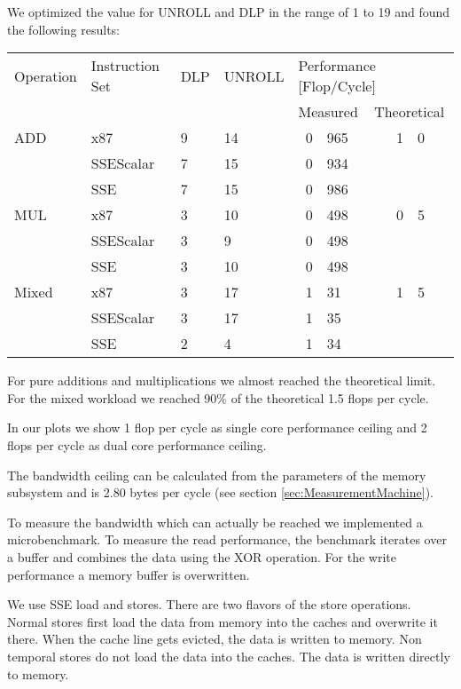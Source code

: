 \documentclass[a4paper,12pt]{article}
\begin{document}
We optimized the value for UNROLL and DLP in the range of 1 to 19 and found the
following results:

\begin{center}
\begin{tabular}{llllr@{.}lr@{.}l}
\toprule
Operation&Instruction Set & DLP & UNROLL &  \multicolumn{4}{l}{Performance
[Flop/Cycle]} \\ \cmidrule{5-8}
&&&&\multicolumn{2}{l}{Measured}&\multicolumn{2}{l}{Theoretical}\\
\midrule
ADD   & x87       &  9 & 14 & 0&965 & 1&0\\
      & SSEScalar &  7 & 15 & 0&934\\
      & SSE       &  7 & 15 & 0&986\\
MUL   & x87       &  3 & 10 & 0&498 & 0&5\\
      & SSEScalar &  3 &  9 & 0&498\\
      & SSE       &  3 & 10 & 0&498\\
Mixed & x87       &  3 & 17 & 1&31 & 1&5\\
      &SSEScalar  &  3 & 17 & 1&35\\
      &SSE        &  2 &  4 & 1&34\\
\bottomrule
\end{tabular}
\end{center}

For pure additions and multiplications we almost reached the theoretical limit.
For the mixed workload we reached 90\% of the theoretical 1.5 flops per cycle.

In our plots we show 1 flop per cycle as single core performance ceiling and 2
flops per cycle as dual core performance ceiling.

The bandwidth ceiling can be calculated from the parameters of the memory
subsystem and is 2.80 bytes per cycle (see section
\ref{sec:MeasurementMachine}).

To measure the bandwidth which can actually be reached we implemented a
microbenchmark. To measure the read performance, the benchmark iterates over a
buffer and combines the data using the XOR operation. For the write performance
a memory buffer is overwritten.

We use SSE load and stores. There are two flavors of the store operations.
Normal stores first load the data from memory into the caches and overwrite it
there. When the cache line gets evicted, the data is written to memory.
Non temporal stores do not load the data into the caches. The data is written
directly to memory.
\end{document}
